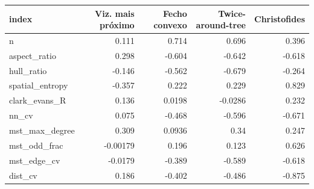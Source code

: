 \begin{tabular}{lrrrr}
\hline
index & Viz. mais próximo & Fecho convexo & Twice-around-tree & Christofides \\
\hline
n & 0.111 & 0.714 & 0.696 & 0.396 \\
aspect\_ratio & 0.298 & -0.604 & -0.642 & -0.618 \\
hull\_ratio & -0.146 & -0.562 & -0.679 & -0.264 \\
spatial\_entropy & -0.357 & 0.222 & 0.229 & 0.829 \\
clark\_evans\_R & 0.136 & 0.0198 & -0.0286 & 0.232 \\
nn\_cv & 0.075 & -0.468 & -0.596 & -0.671 \\
mst\_max\_degree & 0.309 & 0.0936 & 0.34 & 0.247 \\
mst\_odd\_frac & -0.00179 & 0.196 & 0.123 & 0.626 \\
mst\_edge\_cv & -0.0179 & -0.389 & -0.589 & -0.618 \\
dist\_cv & 0.186 & -0.402 & -0.486 & -0.875 \\
\hline
\end{tabular}
